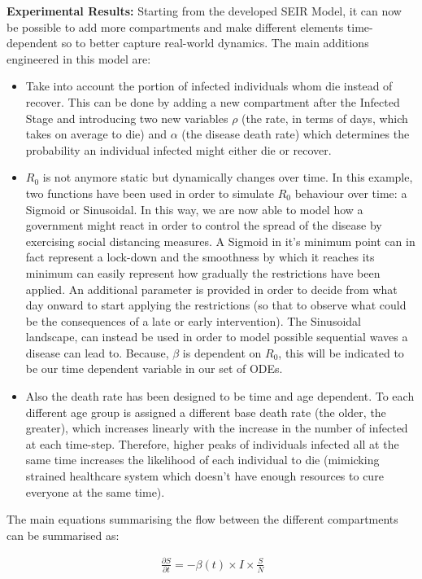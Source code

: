 \textbf{Experimental Results:} Starting from the developed SEIR Model, it can now be possible to add more compartments and make different elements time-dependent so to better capture real-world dynamics. The main additions engineered in this model are:
\begin{itemize}
    \item Take into account the portion of infected individuals whom die instead of recover. This can be done by adding a new compartment after the Infected Stage and introducing two new variables $\rho$ (the rate, in terms of days, which takes on average to die) and $\alpha$ (the disease death rate) which determines the probability an individual infected might either die or recover.
    \item $R_{0}$ is not anymore static but dynamically changes over time. In this example, two functions have been used  in order to simulate $R_{0}$ behaviour over time: a Sigmoid or Sinusoidal. In this way, we are now able to model
    how a government might react in order to control the spread of the disease by exercising social distancing measures. A Sigmoid in it's minimum point can in fact represent a lock-down and the smoothness by which it reaches its minimum can
    easily represent how gradually the restrictions have been applied. An additional parameter is provided in order to decide from what day onward to start applying the restrictions (so that to observe what could be the consequences of a late or early intervention). The Sinusoidal landscape, can instead be used in order to model possible sequential waves a disease can lead to. Because, $\beta$ is dependent on  $R_{0}$, this will be indicated to be our time dependent variable in our set of ODEs. 
    \item Also the death rate has been designed to be time and age dependent. To each different age group is assigned a different base death rate (the older, the greater), which increases linearly with the increase in the number of infected at each time-step. Therefore, higher peaks of individuals infected all at the same time increases the likelihood of each individual to die (mimicking strained healthcare system which doesn't have enough resources to cure everyone at the same time).
\end{itemize}

The main equations summarising the flow between the different compartments can be summarised as:

\useshortskip
\begin{align}
\ \frac{\partial S}{\partial t} = -\beta(t) \times I \times \frac{S}{N}
\end{align}
\useshortskip

